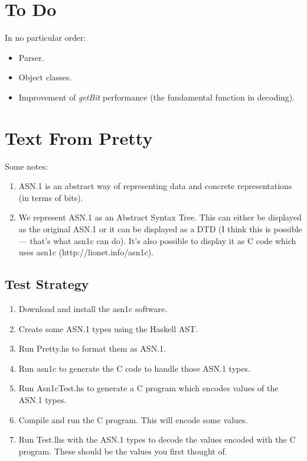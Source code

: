 \documentclass{article}
\begin{document}
\section{To Do}

In no particular order:

\begin{itemize}

\item
Parser.

\item
Object classes.

\item
Improvement of {\em getBit} performance (the fundamental function in decoding).

\end{itemize}

\section{Text From Pretty}
Some notes:

\begin{enumerate}

\item
ASN.1 is an abstract way of representing data and concrete representations (in terms of bits).
\item
We represent ASN.1 as an Abstract Syntax Tree.
This can either be displayed as the original ASN.1 or it can be displayed as a DTD
(I think this is possible --- that's what asn1c can do).
It's also possible to display it as C code which uses asn1c (http://lionet.info/asn1c).
\end{enumerate}

\subsection{Test Strategy}
\begin{enumerate}
\item
Download and install the asn1c software.
\item
Create some ASN.1 types using the Haskell AST.
\item
Run Pretty.hs to format them as ASN.1.
\item
Run asn1c to generate the C code to handle those ASN.1 types.
\item
Run Asn1cTest.hs to generate a C program which encodes values of the ASN.1 types.
\item
Compile and run the C program. This will encode some values.
\item
Run Test.lhs with the ASN.1 types to decode the values encoded with the C program.
These should be the values you first thought of.
\end{enumerate}
\end{document}
